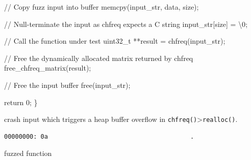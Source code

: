 \documentclass[
  a4paper,
]{scrreprt}
\newenvironment{Shaded}{\begin{snugshade}}{\end{snugshade}}
\newcommand{\CharTok}[1]{\textcolor[rgb]{0.00,0.50,0.00}{#1}}
\newcommand{\CommentTok}[1]{\textcolor[rgb]{0.41,0.41,0.41}{#1}}
\newcommand{\ControlFlowTok}[1]{\textcolor[rgb]{0.85,0.12,0.09}{#1}}
\newcommand{\DataTypeTok}[1]{\textcolor[rgb]{0.47,0.16,0.63}{#1}}
\newcommand{\DecValTok}[1]{\textcolor[rgb]{0.47,0.16,0.63}{#1}}
\newcommand{\NormalTok}[1]{\textcolor[rgb]{0.33,0.33,0.33}{#1}}
\newcommand{\OperatorTok}[1]{\textcolor[rgb]{0.00,0.46,0.62}{#1}}
\newcommand{\SpecialCharTok}[1]{\textcolor[rgb]{0.00,0.46,0.62}{#1}}
\theoremstyle{definition}
\theoremstyle{remark}
\begin{document}
\begin{Shaded}
\begin{Highlighting}[numbers=left,,]
    \CommentTok{// Copy fuzz input into buffer}
\NormalTok{    memcpy}\OperatorTok{(}\NormalTok{input\_str}\OperatorTok{,}\NormalTok{ data}\OperatorTok{,}\NormalTok{ size}\OperatorTok{);}

    \CommentTok{// Null{-}terminate the input as chfreq expects a C string}
\NormalTok{    input\_str}\OperatorTok{[}\NormalTok{size}\OperatorTok{]} \OperatorTok{=} \CharTok{\textquotesingle{}}\SpecialCharTok{\textbackslash{}0}\CharTok{\textquotesingle{}}\OperatorTok{;}

    \CommentTok{// Call the function under test}
    \DataTypeTok{uint32\_t} \OperatorTok{**}\NormalTok{result }\OperatorTok{=}\NormalTok{ chfreq}\OperatorTok{(}\NormalTok{input\_str}\OperatorTok{);}

    \CommentTok{// Free the dynamically allocated matrix returned by chfreq}
\NormalTok{    free\_chfreq\_matrix}\OperatorTok{(}\NormalTok{result}\OperatorTok{);}

    \CommentTok{// Free the input buffer}
\NormalTok{    free}\OperatorTok{(}\NormalTok{input\_str}\OperatorTok{);}

    \ControlFlowTok{return} \DecValTok{0}\OperatorTok{;}
\OperatorTok{\}}
\end{Highlighting}
\end{Shaded}

crash input which triggers a heap buffer overflow in
\texttt{chfreq()}\textgreater{}\texttt{realloc()}.

\begin{verbatim}
00000000: 0a                                       .
\end{verbatim}

fuzzed function
\end{document}
